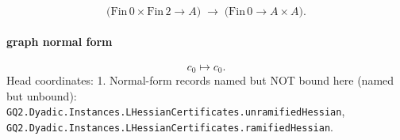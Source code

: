 \[\bigl(\mathrm{Fin}\,0\times\mathrm{Fin}\,2\to A\bigr)\;\longrightarrow\;\bigl(\mathrm{Fin}\,0\to A\times A\bigr).\]
\paragraph{graph normal form}
\[c_0\mapsto c_0.\]
Head coordinates: 1. Normal-form records named but NOT bound here (named but unbound): \texttt{GQ2.Dyadic.Instances.LHessianCertificates.unramifiedHessian}, \texttt{GQ2.Dyadic.Instances.LHessianCertificates.ramifiedHessian}.

